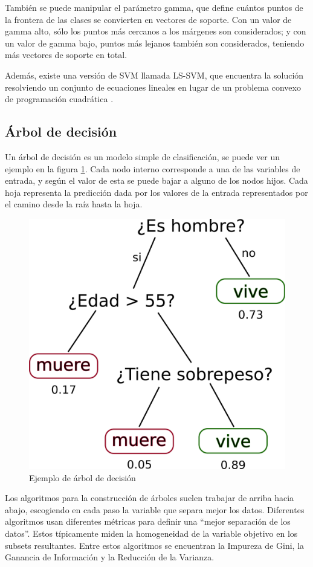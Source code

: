 También se puede manipular el parámetro gamma, que define cuántos puntos de la frontera de las clases se convierten en vectores de soporte. Con un valor de gamma alto, sólo los puntos más cercanos a los márgenes son considerados; y con un valor de gamma bajo, puntos más lejanos también son considerados, teniendo más vectores de soporte en total.

Además, existe una versión de \ac{SVM} llamada \ac{LS-SVM}, que encuentra la solución resolviendo un conjunto de ecuaciones lineales en lugar de un problema convexo de programación cuadrática \citep{ak2002least}.

\subsection{Árbol de decisión}

Un árbol de decisión es un modelo simple de clasificación, se puede ver un ejemplo en la figura \ref{fig:dt-eg}. Cada nodo interno corresponde a una de las variables de entrada, y según el valor de esta se puede bajar a alguno de los nodos hijos. Cada hoja representa la predicción dada por los valores de la entrada representados por el camino desde la raíz hasta la hoja.

\begin{figure}[htbp]
	\centering
	\includegraphics[width=0.4\linewidth]{graficos/propios/arbol_decision.png}
	\caption{Ejemplo de árbol de decisión}
	\label{fig:dt-eg}
\end{figure}

Los algoritmos para la construcción de árboles suelen trabajar de arriba hacia abajo, escogiendo en cada paso la variable que separa mejor los datos. Diferentes algoritmos usan diferentes métricas para definir una ``mejor separación de los datos''. Estos típicamente miden la homogeneidad de la variable objetivo en los subsets resultantes. Entre estos algoritmos se encuentran la Impureza de Gini, la Ganancia de Información y la Reducción de la Varianza.


